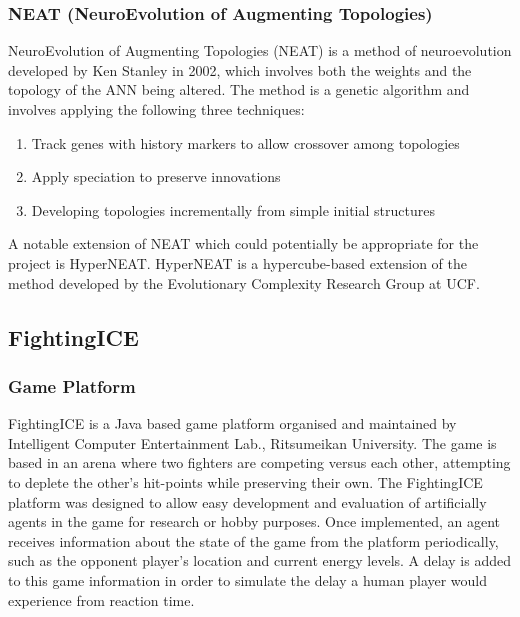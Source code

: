 \documentclass[11pt,a4paper]{article}
\begin{document}
\subsubsection{NEAT (NeuroEvolution of Augmenting Topologies)}
NeuroEvolution of Augmenting Topologies (NEAT) is a method of neuroevolution developed by Ken Stanley in 2002, which involves both the weights and the topology of the ANN being altered. The method is a genetic algorithm and involves applying the following three techniques: \cite{neat}
\begin{enumerate}
\item Track genes with history markers to allow crossover among topologies
\item Apply speciation to preserve innovations
\item Developing topologies incrementally from simple initial structures
\end{enumerate}
A notable extension of NEAT which could potentially be appropriate for the project is HyperNEAT. HyperNEAT is a hypercube-based extension of the method developed by the Evolutionary Complexity Research Group at UCF. \cite{hypehype} \cite{hyperneat}
\newpage
\subsection{FightingICE}
\subsubsection{Game Platform}
FightingICE is a Java based game platform organised and maintained by Intelligent Computer Entertainment Lab., Ritsumeikan University. The game is based in an arena where two fighters are competing versus each other, attempting to deplete the other's hit-points while preserving their own. The FightingICE platform was designed to allow easy development and evaluation of artificially agents in the game for research or hobby purposes. Once implemented, an agent receives information about the state of the game from the platform periodically, such as the opponent player's location and current energy levels. A delay is added to this game information in order to simulate the delay a human player would experience from reaction time. \cite{fightingice}\\
\end{document}
